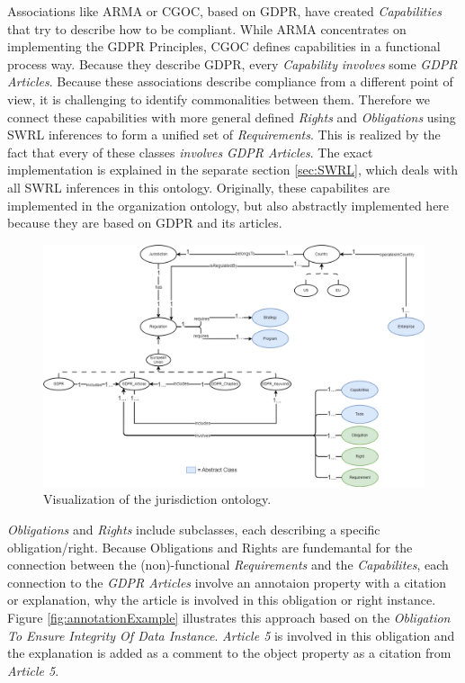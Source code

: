 \documentclass[
  a4paper,  %
  twoside,  %
  bibliography=totoc,
  headsepline,
  cleardoublepage=empty,
  parskip=half,
  draft=false
]{scrbook}
\begin{document}
Associations like ARMA or CGOC, based on GDPR, have created \textit{Capabilities} that try to describe how to be compliant. While ARMA concentrates on implementing the GDPR Principles, CGOC defines capabilities in a functional process way. Because they describe GDPR, every \textit{Capability} \textit{involves} some \textit{GDPR Articles}. Because these associations describe compliance from a different point of view, it is challenging to identify commonalities between them. Therefore we connect these capabilities with more general defined \textit{Rights} and \textit{Obligations} using \acrshort{SWRL} inferences to form a unified set of \textit{Requirements}. This is realized by the fact that every of these classes \textit{involves} \textit{GDPR Articles}. The exact implementation is explained in the separate section \ref{sec:SWRL}, which deals with all \acrshort{SWRL} inferences in this ontology.  Originally, these capabilites are implemented in the organization ontology, but also abstractly implemented  here because they are based on GDPR and its articles.  \\



\begin{figure}
  \centering
  \includegraphics[width=\textwidth]{graphics/jurisdiction.drawio.png}
  \caption{Visualization of the jurisdiction ontology.}
  \label{fig:jurisdictionVisualization}
\end{figure}

\textit{Obligations} and \textit{Rights} include subclasses, each describing a specific obligation/right. Because Obligations and Rights are fundemantal for the connection between the (non)-functional \textit{Requirements} and the \textit{Capabilites}, each connection to the \textit{GDPR Articles} involve an annotaion property with a citation or explanation, why the article is involved in this obligation or right instance. Figure \ref{fig:annotationExample} illustrates this approach based on the \textit{Obligation To Ensure Integrity Of Data Instance}. \textit{Article 5} is involved in this obligation and the explanation is added as a comment to the object property as a citation from \textit{Article 5}.
\end{document}
